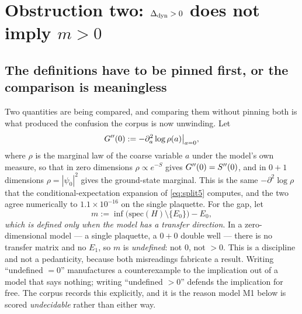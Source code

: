 \section[Obstruction two: the dynamical block does not imply a gap]{Obstruction two: $\Delta_{\mathrm{dyn}}>0$ does not imply $m>0$}\label{sec:obs2}

\subsection{The definitions have to be pinned first, or the comparison is meaningless}

Two quantities are being compared, and comparing them without pinning both is what produced the
confusion the corpus is now unwinding. Let
\begin{equation}
G''(0):=-\partial_a^{2}\log\rho(a)\big|_{a=0},
\label{eq:gdef5}
\end{equation}
where $\rho$ is the marginal law of the coarse variable $a$ under the model's own measure, so that
in zero dimensions $\rho\propto e^{-S}$ gives $G''(0)=S''(0)$, and in $0+1$ dimensions
$\rho=|\psi_0|^{2}$ gives the ground-state marginal. This is the same $-\partial^{2}\log\rho$ that
the conditional-expectation expansion of \eqref{eq:split5} computes, and the two agree numerically
to $1.1\times10^{-16}$ on the single plaquette. \LT{} For the gap, let
\begin{equation}
m:=\inf\bigl(\mathrm{spec}(H)\setminus\{E_0\}\bigr)-E_0 ,
\label{eq:mdef5}
\end{equation}
\emph{which is defined only when the model has a transfer direction}. \LT{} In a
zero-dimensional model --- a single plaquette, a $0+0$ double well --- there is no transfer
matrix and no $E_1$, so $m$ is \emph{undefined}: not $0$, not $>0$. This is a discipline and not a
pedanticity, because both misreadings fabricate a result. Writing ``undefined $=0$'' manufactures
a counterexample to the implication out of a model that says nothing; writing ``undefined $>0$''
defends the implication for free. The corpus records this explicitly, and it is the reason model
M1 below is scored \emph{undecidable} rather than either way.


